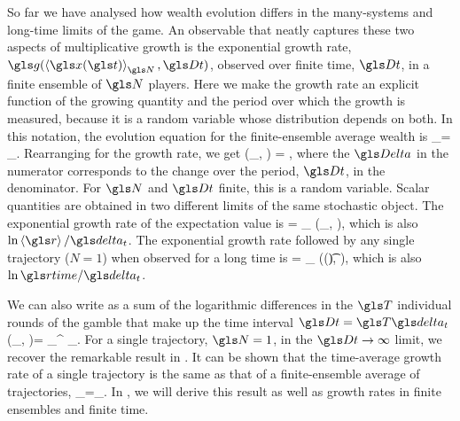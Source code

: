 
So far we have analysed how wealth evolution differs in the many-systems and long-time limits of the game. An observable that neatly captures these two aspects of multiplicative growth is the exponential growth rate, $\g(\ave{\x(\t)}_\N, \Dt)$, observed over finite time, $\Dt$, in a finite ensemble of $\N$ players. Here we make the growth rate an explicit function of the growing quantity and the period over which the growth is measured, because it is a random variable whose distribution depends on both. In this notation, the evolution equation for the finite-ensemble average wealth is
\be
\ave{\x(\t+\Dt)}_\N = \ave{\x(\t)}_\N \exp \left[ \g(\ave{\x(\t)}_\N, \Dt) \Dt \right].
\ee
Rearranging for the growth rate, we get
\be
\g(\ave{\x(\t)}_\N, \Dt) = \frac{\D \ln \ave{\x}_\N}{\Dt},
\ee
where the $\D$ in the numerator corresponds to the change over the period, $\Dt$, in the denominator. For $\N$ and $\Dt$ finite, this is a random variable. Scalar quantities are obtained in two different limits of the same stochastic object. The exponential growth rate of the expectation value is
\be
\ggave = \lim_{\N\to\infty} \g(\ave{\x(\t)}_\N, \Dt),
\ee
which is also $\ln \ave{\gr}/\dt$. The exponential growth rate followed by any single trajectory ($N=1$) when observed for a long time is 
\be
\ggtime = \lim_{\Dt\to\infty} \g(\x(\t), \Dt),
\ee
which is also $\ln \grtime/\dt$.

We can also write  as a sum of the logarithmic differences in the $\T$ individual rounds of the gamble that make up the time interval $\Dt=\T \dt$
\be
\g(\ave{\x(\t)}_\N, \Dt)=  \sum_{}^{\T} \D\ln \ave{\x(\t+\gtau\dt)}_\N.
\ee
For a single trajectory, $\N=1$, in the $\Dt\to\infty$ limit, we recover the remarkable result in .
It can be shown \cite{PetersKlein2013} that the time-average growth rate of a single trajectory is the same as that of a finite-ensemble average of trajectories, \ie 
\be
\lim_{\Dt\to\infty}\frac{\D \ln \x}{\Dt}=\lim_{\Dt\to\infty}.
\ee
In , we will derive this result as well as growth rates in finite ensembles and finite time.

